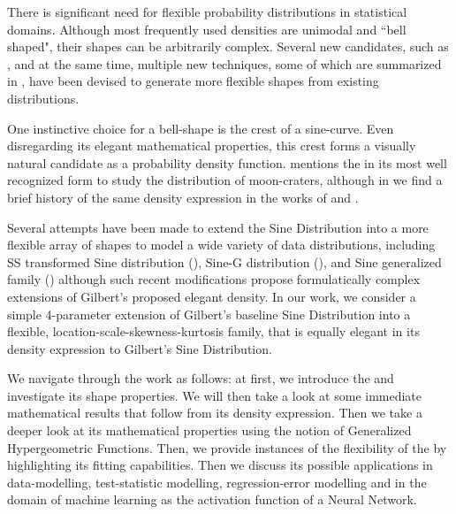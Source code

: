 There is significant need for flexible probability distributions in statistical domains. Although most frequently used densities are unimodal and ``bell shaped", their shapes can be arbitrarily complex. Several new candidates, such as \cite{chalabi2012flexible}, and at the same time, multiple new techniques, some of which are summarized in \cite{anusha2024dists}, have been devised to generate more flexible shapes from existing distributions.

One instinctive choice for a bell-shape is the crest of a sine-curve. Even disregarding its elegant mathematical properties, this crest forms a visually natural candidate as a probability density function. \cite{gilbert1893moon} mentions the \sindist{} in its most well recognized form to study the distribution of moon-craters, although in \cite{edwards2000sine} we find a brief history of the same density expression in the works of \cite{lagrange1770memoire} and \cite{pearson1902systematic}.

Several attempts have been made to extend the Sine Distribution into a more flexible array of shapes to model a wide variety of data distributions, including SS transformed Sine distribution (\cite{kumar2015bladder}), Sine-G distribution (\cite{mahmood2019sineg}), and Sine generalized family (\cite{oramulu2024sinegen}) although such recent modifications propose formulatically complex extensions of Gilbert's proposed elegant density. In our work, we consider a simple 4-parameter extension of Gilbert's baseline Sine Distribution into a flexible, location-scale-skewness-kurtosis family, that is equally elegant in its density expression to Gilbert's Sine Distribution.

We navigate through the work as follows: at first, we introduce the \sindist{} and investigate its shape properties. We will then take a look at some immediate mathematical results that follow from its density expression. Then we take a deeper look at its mathematical properties using the notion of Generalized Hypergeometric Functions. Then, we provide instances of the flexibility of the \sindist{} by highlighting its fitting capabilities. Then we discuss its possible applications in data-modelling, test-statistic modelling, regression-error modelling and in the domain of machine learning as the activation function of a Neural Network.